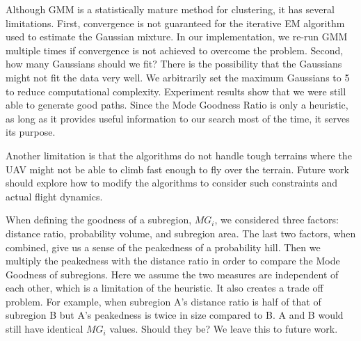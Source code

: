\documentclass[journal]{IEEEtran}
\begin{document}
Although GMM is a statistically mature method for clustering, it has several limitations. First, convergence is not guaranteed for the iterative EM algorithm used to estimate the Gaussian mixture. In our implementation, we re-run GMM multiple times if convergence is not achieved to overcome the problem. Second, how many Gaussians should we fit? There is the possibility that the Gaussians might not fit the data very well. We arbitrarily set the maximum Gaussians to 5 to reduce computational complexity. Experiment results show that we were still able to generate good paths. Since the Mode Goodness Ratio is only a heuristic, as long as it provides useful information to our search most of the time, it serves its purpose.

Another limitation is that the algorithms do not handle tough terrains where the UAV might not be able to climb fast enough to fly over the terrain. Future work should explore how to modify the algorithms to consider such constraints and actual flight dynamics.

When defining the goodness of a subregion, $MG_i$, we considered three factors: distance ratio, probability volume, and subregion area. The last two factors, when combined, give us a sense of the peakedness of a probability hill. Then we multiply the peakedness with the distance ratio in order to compare the Mode Goodness of subregions. Here we assume the two measures are independent of each other, which is a limitation of the heuristic. It also creates a trade off problem. For example, when subregion A's distance ratio is half of that of subregion B but A's peakedness is twice in size compared to B. A and B would still have identical $MG_i$ values. Should they be? We leave this to future work.
\end{document}
